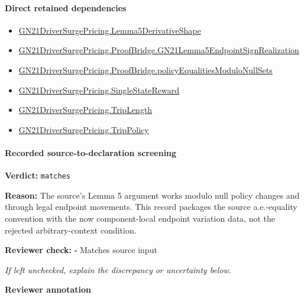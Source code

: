 \documentclass[10pt]{article}
\newcommand{\reviewerbox}{%
  \par\noindent\fbox{\parbox{0.96\linewidth}{\rule{0pt}{0.38in}}}\par
}
\newcommand{\reviewmatch}[1]{%
  \par\noindent\textbf{Reviewer check:} $\square$\; #1\par
  \noindent\emph{If left unchecked, explain the discrepancy or uncertainty below.}\par
}
\begin{document}
\paragraph{Direct retained dependencies}
\begin{itemize}\raggedright
\item \hyperlink{paper-prerequisite-bdf8218f91905191}{GN21\allowbreak{}Driver\allowbreak{}Surge\allowbreak{}Pricing.\allowbreak{}Lemma5\allowbreak{}Derivative\allowbreak{}Shape}
\item \hyperlink{paper-prerequisite-d8d86ba99f27fa35}{GN21\allowbreak{}Driver\allowbreak{}Surge\allowbreak{}Pricing.\allowbreak{}Proof\allowbreak{}Bridge.\allowbreak{}GN21\allowbreak{}Lemma5\allowbreak{}Endpoint\allowbreak{}Sign\allowbreak{}Realization}
\item \hyperlink{governing-declaration-3600a52824753851}{GN21\allowbreak{}Driver\allowbreak{}Surge\allowbreak{}Pricing.\allowbreak{}Proof\allowbreak{}Bridge.\allowbreak{}policy\allowbreak{}Equalities\allowbreak{}Modulo\allowbreak{}Null\allowbreak{}Sets}
\item \hyperlink{governing-declaration-f7708ce48623a5e0}{GN21\allowbreak{}Driver\allowbreak{}Surge\allowbreak{}Pricing.\allowbreak{}Single\allowbreak{}State\allowbreak{}Reward}
\item \hyperlink{governing-declaration-a616c143f22cf2bc}{GN21\allowbreak{}Driver\allowbreak{}Surge\allowbreak{}Pricing.\allowbreak{}Trip\allowbreak{}Length}
\item \hyperlink{governing-declaration-4312ad4cb899871f}{GN21\allowbreak{}Driver\allowbreak{}Surge\allowbreak{}Pricing.\allowbreak{}Trip\allowbreak{}Policy}
\end{itemize}
\paragraph{Recorded source-to-declaration screening}
\textbf{Verdict:} \texttt{matches}
\\
{\raggedright
\textbf{Reason:} The source's Lemma 5 argument works modulo null policy changes and through legal endpoint movements.\allowbreak{} This record packages the source a.\allowbreak{}e.\allowbreak{}-\allowbreak{}equality convention with the now component-\allowbreak{}local endpoint variation data, not the rejected arbitrary-\allowbreak{}context condition.\allowbreak{}
\par}
\reviewmatch{Matches source input}
\noindent\textbf{Reviewer annotation}\par
\reviewerbox
\clearpage
\hypertarget{paper-prerequisite-a6cc9c4b5d87298b}{}
\end{document}
